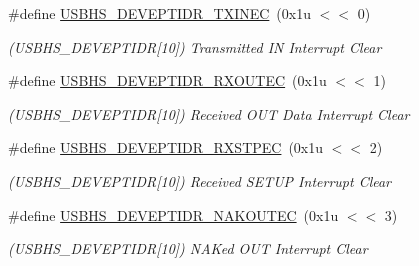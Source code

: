 \begin{DoxyCompactItemize}
\mbox{\label{group__SAMV71__USBHS_ga7b395bca7982f0492694c66539197454}} 
\#define \mbox{\hyperlink{group__SAMV71__USBHS_ga7b395bca7982f0492694c66539197454}{U\+S\+B\+H\+S\+\_\+\+D\+E\+V\+E\+P\+T\+I\+D\+R\+\_\+\+T\+X\+I\+N\+EC}}~(0x1u $<$$<$ 0)
\begin{DoxyCompactList}\small\item\em (U\+S\+B\+H\+S\+\_\+\+D\+E\+V\+E\+P\+T\+I\+DR\mbox{[}10\mbox{]}) Transmitted IN Interrupt Clear \end{DoxyCompactList}\item 
\mbox{\label{group__SAMV71__USBHS_ga3b95dfd74fd8bec25a27705437795a3c}} 
\#define \mbox{\hyperlink{group__SAMV71__USBHS_ga3b95dfd74fd8bec25a27705437795a3c}{U\+S\+B\+H\+S\+\_\+\+D\+E\+V\+E\+P\+T\+I\+D\+R\+\_\+\+R\+X\+O\+U\+T\+EC}}~(0x1u $<$$<$ 1)
\begin{DoxyCompactList}\small\item\em (U\+S\+B\+H\+S\+\_\+\+D\+E\+V\+E\+P\+T\+I\+DR\mbox{[}10\mbox{]}) Received O\+UT Data Interrupt Clear \end{DoxyCompactList}\item 
\mbox{\label{group__SAMV71__USBHS_ga18068a537cfad8da0c67350f65957253}} 
\#define \mbox{\hyperlink{group__SAMV71__USBHS_ga18068a537cfad8da0c67350f65957253}{U\+S\+B\+H\+S\+\_\+\+D\+E\+V\+E\+P\+T\+I\+D\+R\+\_\+\+R\+X\+S\+T\+P\+EC}}~(0x1u $<$$<$ 2)
\begin{DoxyCompactList}\small\item\em (U\+S\+B\+H\+S\+\_\+\+D\+E\+V\+E\+P\+T\+I\+DR\mbox{[}10\mbox{]}) Received S\+E\+T\+UP Interrupt Clear \end{DoxyCompactList}\item 
\mbox{\label{group__SAMV71__USBHS_ga129076516fd5a8e9f0067f014ac39e12}} 
\#define \mbox{\hyperlink{group__SAMV71__USBHS_ga129076516fd5a8e9f0067f014ac39e12}{U\+S\+B\+H\+S\+\_\+\+D\+E\+V\+E\+P\+T\+I\+D\+R\+\_\+\+N\+A\+K\+O\+U\+T\+EC}}~(0x1u $<$$<$ 3)
\begin{DoxyCompactList}\small\item\em (U\+S\+B\+H\+S\+\_\+\+D\+E\+V\+E\+P\+T\+I\+DR\mbox{[}10\mbox{]}) N\+A\+Ked O\+UT Interrupt Clear \end{DoxyCompactList}\item 
\mbox{\label{group__SAMV71__USBHS_ga421f5227963f7f012335278589732375}} 

\end{DoxyCompactItemize}
